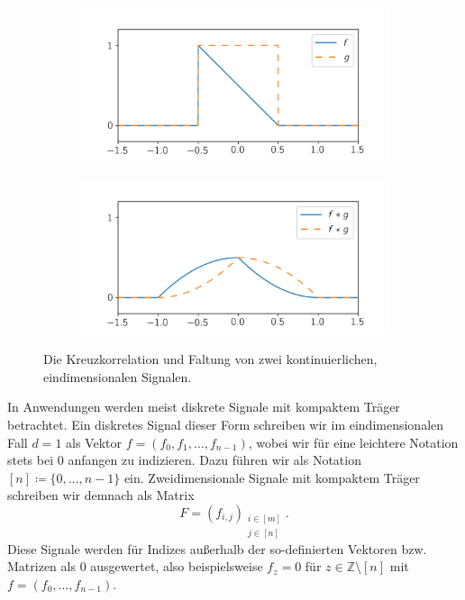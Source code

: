 \documentclass[paper=a4, 	%
		fontsize=11pt,
		abstract=true, 	%
		headsepline, 	%
		notitlepage	%
		]{scrartcl}
\theoremstyle{definition}
\newcommand{\Z}{\mathbb{Z}}
\newcommand{\fNat}[1]{[ #1 ]}
\begin{document}
\begin{figure}
    \begin{subfigure}[c]{0.5\textwidth}
        \includegraphics[width=\textwidth]{g.png}
    \end{subfigure}%
    \begin{subfigure}[c]{0.5\textwidth}
        \includegraphics[width=\textwidth]{corrs.png}
    \end{subfigure}
    \caption{
        Die Kreuzkorrelation und Faltung von zwei kontinuierlichen, eindimensionalen Signalen.
    }
    \label{fig:one-dim-cont-conv}
\end{figure}


In Anwendungen werden meist diskrete Signale mit kompaktem Träger betrachtet.
Ein diskretes Signal dieser Form schreiben wir im eindimensionalen Fall $d=1$ als Vektor $f = (f_0, f_1, \dots, f_{n-1})$, wobei wir für eine leichtere Notation stets bei $0$ anfangen zu indizieren.
Dazu führen wir als Notation $\fNat{n}\coloneqq \{0, \dots, n-1\}$ ein. 
Zweidimensionale Signale mit kompaktem Träger schreiben wir demnach als Matrix $$F = (f_{i,j})_{\substack{i\in\fNat{m}\\ j\in\fNat{n}}}.$$
Diese Signale werden für Indizes außerhalb der so-definierten Vektoren bzw. Matrizen als $0$ ausgewertet, also beispielsweise $f_z = 0$ für $z\in\Z\setminus\fNat{n}$ mit $f=(f_0, \dots, f_{n-1})$.
\end{document}
